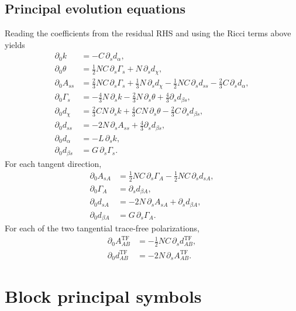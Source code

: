 \documentclass[11pt]{article}
\newcommand{\dtzero}{\partial_0}
\newcommand{\tf}{\mathrm{TF}}
\begin{document}
\subsection{Principal evolution equations}

Reading the coefficients from the residual RHS and using the Ricci terms
above yields
\begin{align}
 \dtzero k
   &=-C\,\partial_s d_\alpha,\\
 \dtzero\theta
   &=\frac12NC\,\partial_s\Gamma_s+N\,\partial_s d_\chi,\\
 \dtzero A_{ss}
   &=\frac23NC\,\partial_s\Gamma_s
     +\frac13N\,\partial_s d_\chi
     -\frac12NC\,\partial_s d_{ss}
     -\frac23C\,\partial_s d_\alpha,\\
 \dtzero\Gamma_s
   &=-\frac43N\,\partial_s k-\frac23N\,\partial_s\theta
     +\frac43\partial_s d_{\beta s},\\
 \dtzero d_\chi
   &=\frac23CN\,\partial_s k+\frac43CN\,\partial_s\theta
     -\frac23C\,\partial_s d_{\beta s},\\
 \dtzero d_{ss}
   &=-2N\,\partial_s A_{ss}+\frac43\partial_s d_{\beta s},\\
 \dtzero d_\alpha
   &=-L\,\partial_s k,\\
 \dtzero d_{\beta s}
   &=G\,\partial_s\Gamma_s.
 \label{eq:scalar-evolution}
\end{align}
For each tangent direction,
\begin{align}
 \dtzero A_{sA}
   &=\frac12NC\,\partial_s\Gamma_A
     -\frac12NC\,\partial_s d_{sA},\\
 \dtzero\Gamma_A&=\partial_s d_{\beta A},\\
 \dtzero d_{sA}&=-2N\,\partial_s A_{sA}
                       +\partial_s d_{\beta A},\\
 \dtzero d_{\beta A}&=G\,\partial_s\Gamma_A.
 \label{eq:vector-evolution}
\end{align}
For each of the two tangential trace-free polarizations,
\begin{align}
 \dtzero A_{AB}^{\tf}
   &=-\frac12NC\,\partial_s d_{AB}^{\tf},\\
 \dtzero d_{AB}^{\tf}
   &=-2N\,\partial_s A_{AB}^{\tf}.
 \label{eq:tensor-evolution}
\end{align}

\section{Block principal symbols}
\end{document}
